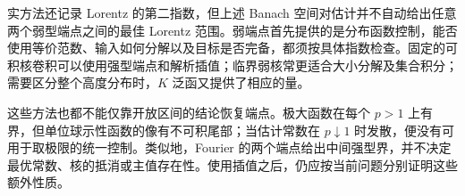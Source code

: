 \ProseParagraphBreak

实方法还记录 Lorentz 的第二指数，但上述 Banach 空间对估计并不自动给出任意两个弱型端点之间的最佳 Lorentz 范围。弱端点首先提供的是分布函数控制，能否使用等价范数、输入如何分解以及目标是否完备，都须按具体指数检查。固定的可积核卷积可以使用强型端点和解析插值；临界弱核常更适合大小分解及集合积分；需要区分整个高度分布时，\(K\) 泛函又提供了相应的量。

\ProseParagraphBreak

这些方法也都不能仅靠开放区间的结论恢复端点。极大函数在每个 \(p>1\) 上有界，但单位球示性函数的像有不可积尾部；当估计常数在 \(p\downarrow1\) 时发散，便没有可用于取极限的统一控制。类似地，Fourier 的两个端点给出中间强型界，并不决定最优常数、核的抵消或主值存在性。使用插值之后，仍应按当前问题分别证明这些额外性质。
